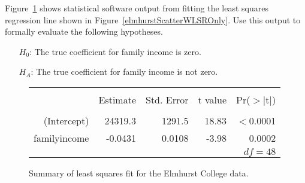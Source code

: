 \begin{exercisewrap}
\begin{nexercise}
Figure~\ref{rOutputForIncomeAidLSRLineInInferenceSection}
shows statistical software output from fitting the least
squares regression line shown in
Figure~\ref{elmhurstScatterWLSROnly}.
Use this output to formally evaluate the following
hypotheses.\footnotemark{}
\begin{itemize}
\setlength{\itemsep}{0mm}
\item[$H_0$:]
    The true coefficient for family income is zero.
\item[$H_A$:]
    The true coefficient for family income is not zero.
\end{itemize}
\end{nexercise}
\end{exercisewrap}

\begin{figure}[ht]
\centering
\begin{tabular}{rrrrr}
  \hline
  \vspace{-3.7mm} & & & & \\
 & Estimate & Std. Error & t value & Pr($>$$|$t$|$) \\ 
  \hline
  \vspace{-3.6mm} & & & & \\
(Intercept) & 24319.3 & 1291.5 & 18.83 & $<$0.0001 \\ 
family\us{}income & -0.0431 & 0.0108 & -3.98 & 0.0002 \\ 
   \hline
   \multicolumn{5}{r}{$df=48$} \\
\end{tabular}
\caption{Summary of least squares fit for the Elmhurst College data.}
\label{rOutputForIncomeAidLSRLineInInferenceSection}
\end{figure}


